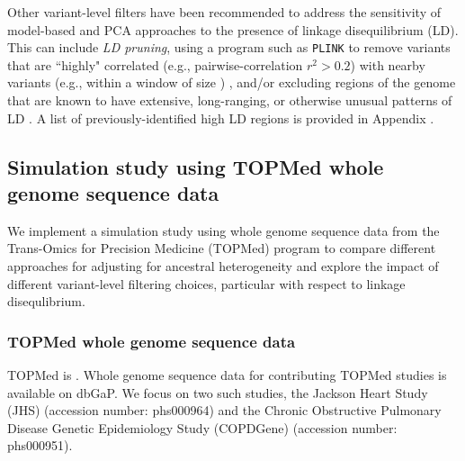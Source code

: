 \documentclass[12pt]{article}
\newcommand{\edit}[1]{{\color{red}{#1}}}
\newcommand{\add}[1]{{\color{red}{[... #1 ...]}}}
\begin{document}
Other variant-level filters have been recommended to address the sensitivity of model-based and PCA approaches to the presence of linkage disequilibrium (LD).
This can include \textit{LD pruning}, using a program such as \texttt{PLINK} \add{CITE} to remove variants that are ``highly" correlated (e.g., pairwise-correlation $r^2 > 0.2$) with nearby variants (e.g., within a window of size \edit{??}) \add{\citep{admixture}, ADD MORE}, and/or excluding regions of the genome that are known to have extensive, long-ranging, or otherwise unusual patterns of LD \add{CITE}. 
A list of previously-identified high LD regions is provided in Appendix \edit{??}. 
\add{say something about how not everyone does this, it's not always clear which parameters should be used, and/or much of this work has been performed in European pop and not clear what should be done in admixed pop}


\add{Add missing rates (SNPs and people) here? Or just frame as QC step?)}


\subsection{Simulation study using TOPMed whole genome sequence data}

\edit{Are we sure we want to use TOPMed? Or should we switch back to WHI?}

We implement a simulation study using whole genome sequence data from the Trans-Omics for Precision Medicine (TOPMed) program to compare different approaches for adjusting for ancestral heterogeneity and explore the impact of different variant-level filtering choices, particular with respect to linkage disequlibrium. 

\subsubsection{TOPMed whole genome sequence data}

TOPMed is \add{describe TOPMed}.
Whole genome sequence data for contributing TOPMed studies is available on dbGaP. 
We focus on two such studies, the Jackson Heart Study (JHS) (accession number: phs000964) and the Chronic Obstructive Pulmonary Disease Genetic Epidemiology Study (COPDGene) (accession number: phs000951).

\edit{
\begin{itemize}
\item describe TOPMed 
\item describe sequencing methods
\item how many samples in each study
\end{itemize}
}
\end{document}
